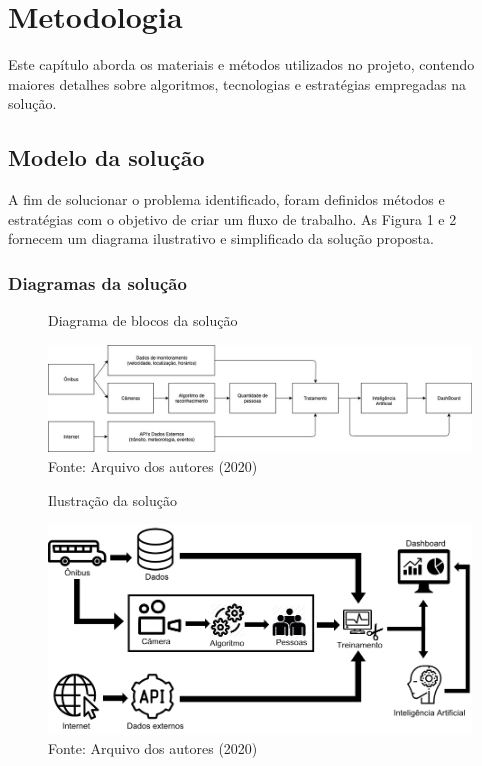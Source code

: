 \chapter{Metodologia}
\label{Cap:MateriaisMetodos}

\indent
\par Este capítulo aborda os materiais e métodos utilizados no projeto, contendo maiores detalhes sobre algoritmos, tecnologias e estratégias empregadas na solução.

\section{Modelo da solução}
\indent
\par A fim de solucionar o problema identificado, foram definidos métodos e estratégias com o objetivo de criar um fluxo de trabalho. As Figura 1 e 2 fornecem um diagrama ilustrativo e simplificado da solução proposta.
\subsection{Diagramas da solução}

\begin{figure}[H]
    \centering
    \caption{Diagrama de blocos da solução}
    \includegraphics[width=1.0\linewidth]{Imagens/diagramaDeBlocos.jpg}
    \caption*{Fonte: Arquivo dos autores (2020)}
    \label{autoai-results}
\end{figure}

\begin{figure}[H]
    \centering
    \caption{Ilustração da solução}
    \includegraphics[width=1.0\linewidth]{Imagens/DiagramaDeBlocosIcones.png}
    \caption*{Fonte: Arquivo dos autores (2020)}
    \label{autoai-results}
\end{figure}


